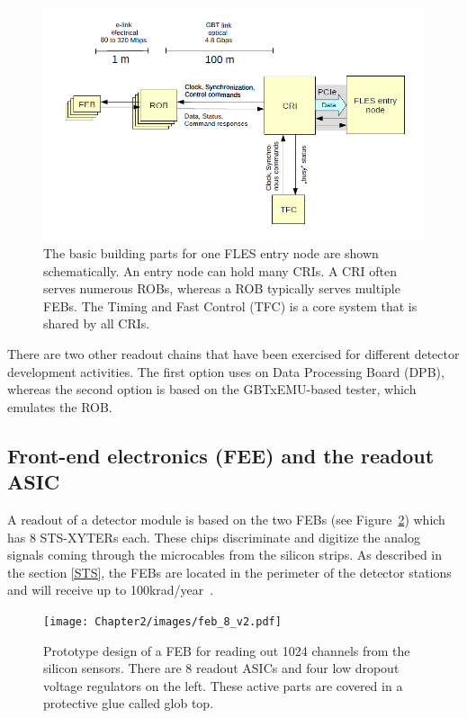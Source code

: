 \begin{figure}[!h]
\centering
\includegraphics[width=0.8\columnwidth]{Chapter2/images/CRI_DAQ.png}
\caption{The basic building parts for one \gls{FLES} entry node are shown schematically. An entry node can hold many \glspl{CRI}. A \gls{CRI} often serves numerous \glspl{ROB}, whereas a \gls{ROB} typically serves multiple \glspl{FEB}. The Timing and Fast Control (\gls{TFC}) is a core system that is shared by all \glspl{CRI}.}
\label{fig_daq_schem}
\end{figure}

There are two other readout chains that have been exercised for different detector development activities. The first option uses on Data Processing Board (\gls{DPB}), whereas
the second option is based on the GBTxEMU-based tester, which emulates the \gls{ROB}.


\subsection{Front-end electronics (FEE) and the readout ASIC}

A readout of a detector module is based on the two \glspl{FEB} (see Figure~\ref{fig_feb}) which has 8 STS-XYTERs each. These chips discriminate and digitize the analog signals coming through the microcables from the silicon strips. As described in the section \ref{STS}, the \glspl{FEB} are located in the perimeter of the detector stations and will receive up to 100krad/year~\cite{Heuser:54798}.

\begin{figure}[!h]
\centering
\texttt{[image: Chapter2/images/feb\_8\_v2.pdf]}
\caption{Prototype design of a \gls{FEB} for reading out 1024 channels from the silicon sensors. There are 8 readout ASICs and four low dropout voltage regulators on the left. These active parts are covered in a protective glue called glob top.}
\label{fig_feb}
\end{figure}

